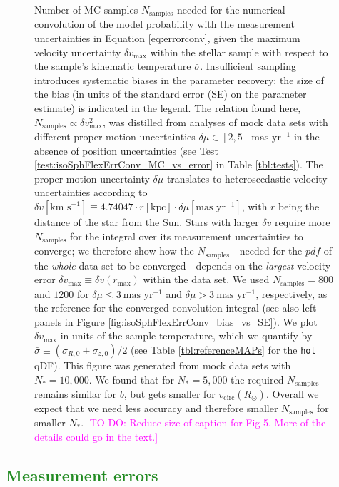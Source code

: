 \documentclass[iop,revtex4]{emulateapj}
\newcommand{\pdf}{\ensuremath{pdf}}
\newcommand{\NEW}[1]{\textcolor{ForestGreen}{#1}}
\newcommand{\Wilma}[1]{\textcolor{Magenta}{#1}}
\begin{document}
\begin{figure}[!htbp]
\caption{Number of MC samples $N_\text{samples}$ needed for the numerical convolution of the model probability with the measurement uncertainties in Equation \eqref{eq:errorconv}, given the maximum velocity uncertainty $\delta v_\text{max}$ within the stellar sample with respect to the sample's kinematic temperature $\bar{\sigma}$. Insufficient sampling introduces systematic biases in the parameter recovery; the size of the bias (in units of the standard error (SE) on the parameter estimate) is indicated in the legend. The relation found here, $N_\text{samples} \propto \delta v_\text{max}^2$, was distilled from analyses of mock data sets with different proper motion uncertainties $\delta \mu \in [2,5]~\text{mas yr}^{-1}$ in the absence of position uncertainties (see Test \ref{test:isoSphFlexErrConv_MC_vs_error} in Table \ref{tbl:tests}). The proper motion uncertainty $\delta \mu$ translates to heteroscedastic velocity uncertainties according to $\delta v [\text{km s}^{-1}] \equiv 4.74047 \cdot r[\text{kpc}] \cdot \delta \mu [\text{mas yr}^{-1}]$, with $r$ being the distance of the star from the Sun. Stars with larger $\delta v$ require more $N_\text{samples}$ for the integral over its measurement uncertainties to converge; we therefore show how the $N_\text{samples}$---needed for the \pdf{} of the \emph{whole} data set to be converged---depends on the \emph{largest} velocity error $\delta v_\text{max} \equiv \delta v(r_\text{max})$ within the data set. We used $N_\text{samples} = 800$ and  $1200$ for $\delta \mu \leq 3~\text{mas yr}^{-1}$ and $\delta \mu > 3~\text{mas yr}^{-1}$, respectively, as the reference for the converged convolution integral (see also left panels in Figure \ref{fig:isoSphFlexErrConv_bias_vs_SE}). We plot $\delta v_\text{max}$ in units of the sample temperature, which we quantify by $\bar{\sigma} \equiv (\sigma_{R,0} + \sigma_{z,0})/2$ (see Table \ref{tbl:referenceMAPs} for the \texttt{hot} qDF). This figure was generated from mock data sets with $N_{*}=10,000$. We found that for $N_{*}=5,000$ the required $N_\text{samples}$ remains similar for $b$, but gets smaller for $v_\text{circ}(R_\odot)$. Overall we expect that we need less accuracy and therefore smaller $N_\text{samples}$ for smaller $N_{*}$.  \Wilma{[TO DO: Reduce size of caption for Fig 5. More of the details could go in the text.]}}
\label{fig:isoSphFlexErrConv_MC_vs_error}
\end{figure}

\subsection{\NEW{Measurement errors}}
\end{document}

